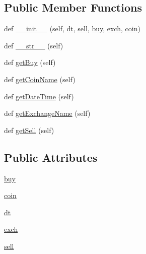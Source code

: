 \subsection*{Public Member Functions}
\begin{DoxyCompactItemize}
\item 
def \hyperlink{classraw__urlparser_1_1_xbt_prices_ae5bf5349c30bd61107bcd3259fc1f455}{\+\_\+\+\_\+init\+\_\+\+\_\+} (self, \hyperlink{classraw__urlparser_1_1_xbt_prices_ae094aa3e73d21d0be219a085f09bcf13}{dt}, \hyperlink{classraw__urlparser_1_1_xbt_prices_a22b483cac27a5b17f9e7b265c219bb99}{sell}, \hyperlink{classraw__urlparser_1_1_xbt_prices_a87eba659d6598ffd66c694535e1b7a7a}{buy}, \hyperlink{classraw__urlparser_1_1_xbt_prices_a016bbd95465aaa14b5c434047df7b7fb}{exch}, \hyperlink{classraw__urlparser_1_1_xbt_prices_a8d253ccd987bce28e3aaba7a9c486e5f}{coin})
\item 
def \hyperlink{classraw__urlparser_1_1_xbt_prices_a8613d27cac39cc195364ea8de17b9660}{\+\_\+\+\_\+str\+\_\+\+\_\+} (self)
\item 
def \hyperlink{classraw__urlparser_1_1_xbt_prices_a263e29ed8476de0cdce0017695f7baaa}{get\+Buy} (self)
\item 
def \hyperlink{classraw__urlparser_1_1_xbt_prices_abb420398e97de1582f8be154c6a66133}{get\+Coin\+Name} (self)
\item 
def \hyperlink{classraw__urlparser_1_1_xbt_prices_a0e29f458ee5bd80b2dfff3b0f08277f5}{get\+Date\+Time} (self)
\item 
def \hyperlink{classraw__urlparser_1_1_xbt_prices_a63b0b449b67f9d1c05d5a3c45f52135a}{get\+Exchange\+Name} (self)
\item 
def \hyperlink{classraw__urlparser_1_1_xbt_prices_a1a1d7e7b76f611ae334b0950b334dda1}{get\+Sell} (self)
\end{DoxyCompactItemize}
\subsection*{Public Attributes}
\begin{DoxyCompactItemize}
\item 
\hyperlink{classraw__urlparser_1_1_xbt_prices_a87eba659d6598ffd66c694535e1b7a7a}{buy}
\item 
\hyperlink{classraw__urlparser_1_1_xbt_prices_a8d253ccd987bce28e3aaba7a9c486e5f}{coin}
\item 
\hyperlink{classraw__urlparser_1_1_xbt_prices_ae094aa3e73d21d0be219a085f09bcf13}{dt}
\item 
\hyperlink{classraw__urlparser_1_1_xbt_prices_a016bbd95465aaa14b5c434047df7b7fb}{exch}
\item 
\hyperlink{classraw__urlparser_1_1_xbt_prices_a22b483cac27a5b17f9e7b265c219bb99}{sell}
\end{DoxyCompactItemize}


